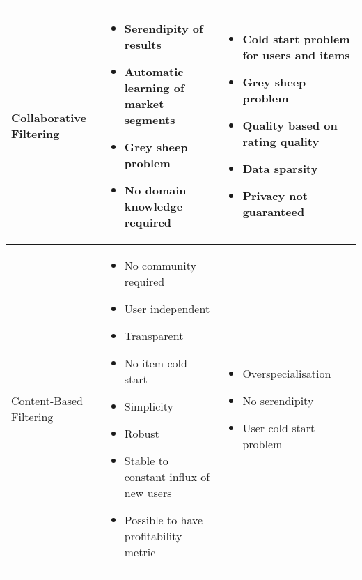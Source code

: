 \begin{table}
    \begin{center}
        \begin{tabularx}{\columnwidth}{X|X|X}
            \hline
            Collaborative Filtering 
            &   \begin{itemize}
                    \item Serendipity of results 
                    \item Automatic learning of market segments
                    \item Grey sheep problem
                    \item No domain knowledge required
                \end{itemize}
            &   \begin{itemize}
                    \item Cold start problem for users and items
                    \item Grey sheep problem
                    \item Quality based on rating quality
                    \item Data sparsity
                    \item Privacy not guaranteed
                \end{itemize} \\
            \hline
            Content-Based Filtering 
            &   \begin{itemize}
                    \item No community required 
                    \item User independent
                    \item Transparent
                    \item No item cold start
                    \item Simplicity
                    \item Robust
                    \item Stable to constant influx of new users
                    \item Possible to have profitability metric
                \end{itemize}
            &   \begin{itemize}
                    \item Overspecialisation
                    \item No serendipity
                    \item User cold start problem

\end{itemize}
\end{tabularx}
\end{center}
\end{table}

